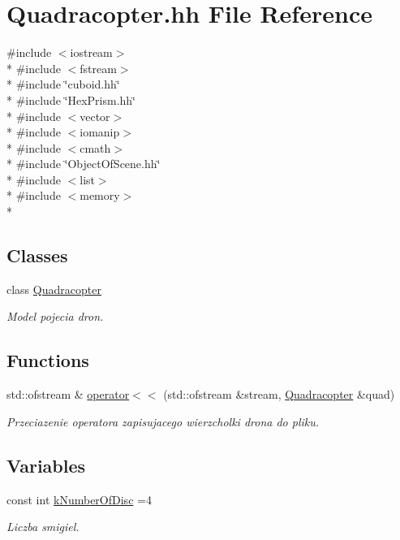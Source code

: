 \hypertarget{_quadracopter_8hh}{}\section{Quadracopter.\+hh File Reference}
\label{_quadracopter_8hh}
{\ttfamily \#include $<$iostream$>$}\\*
{\ttfamily \#include $<$fstream$>$}\\*
{\ttfamily \#include \char`\"{}cuboid.\+hh\char`\"{}}\\*
{\ttfamily \#include \char`\"{}Hex\+Prism.\+hh\char`\"{}}\\*
{\ttfamily \#include $<$vector$>$}\\*
{\ttfamily \#include $<$iomanip$>$}\\*
{\ttfamily \#include $<$cmath$>$}\\*
{\ttfamily \#include \char`\"{}Object\+Of\+Scene.\+hh\char`\"{}}\\*
{\ttfamily \#include $<$list$>$}\\*
{\ttfamily \#include $<$memory$>$}\\*
\subsection*{Classes}
\begin{DoxyCompactItemize}
\item 
class \hyperlink{class_quadracopter}{Quadracopter}
\begin{DoxyCompactList}\small\item\em Model pojecia dron. \end{DoxyCompactList}\end{DoxyCompactItemize}
\subsection*{Functions}
\begin{DoxyCompactItemize}
\item 
std\+::ofstream \& \hyperlink{_quadracopter_8hh_af216f9e5677de029a33dc3f4e580a542}{operator$<$$<$} (std\+::ofstream \&stream, \hyperlink{class_quadracopter}{Quadracopter} \&quad)
\begin{DoxyCompactList}\small\item\em Przeciazenie operatora zapisujacego wierzcholki drona do pliku. \end{DoxyCompactList}\end{DoxyCompactItemize}
\subsection*{Variables}
\begin{DoxyCompactItemize}
\item 
const int \hyperlink{_quadracopter_8hh_ae118ca9ee93d6a5f2588b28d39dee76b}{k\+Number\+Of\+Disc} =4
\begin{DoxyCompactList}\small\item\em Liczba smigiel. \end{DoxyCompactList}\end{DoxyCompactItemize}


